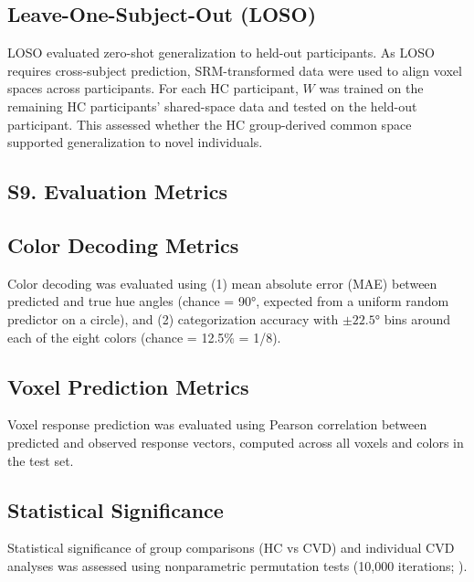 \subsection*{\textbf{Leave-One-Subject-Out (LOSO)}}

LOSO evaluated zero-shot generalization to held-out participants.
As LOSO requires cross-subject prediction, SRM-transformed data were used to align voxel spaces across participants.
For each HC participant, $W$ was trained on the remaining HC participants' shared-space data and tested on the held-out participant.
This assessed whether the HC group-derived common space supported generalization to novel individuals.



\subsection*{\textbf{S9. Evaluation Metrics}}

\subsection*{\textbf{Color Decoding Metrics}}

Color decoding was evaluated using (1) mean absolute error (MAE) between predicted and true hue angles (chance = 90°, expected from a uniform random predictor on a circle), and (2) categorization accuracy with $\pm 22.5$° bins around each of the eight colors (chance = 12.5\% = 1/8).

\subsection*{\textbf{Voxel Prediction Metrics}}

Voxel response prediction was evaluated using Pearson correlation between predicted and observed response vectors, computed across all voxels and colors in the test set.

\subsection*{\textbf{Statistical Significance}}

Statistical significance of group comparisons (HC vs CVD) and individual CVD analyses was assessed using nonparametric permutation tests (10,000 iterations; ).



